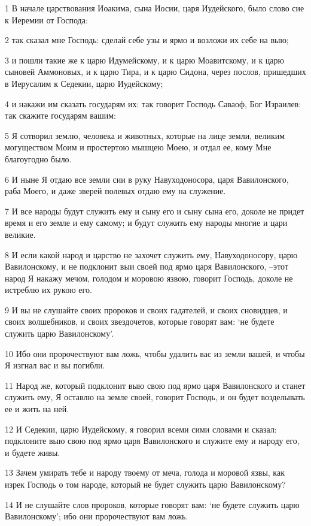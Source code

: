 \par 1 В начале царствования Иоакима, сына Иосии, царя Иудейского, было слово сие к Иеремии от Господа:
\par 2 так сказал мне Господь: сделай себе узы и ярмо и возложи их себе на выю;
\par 3 и пошли такие же к царю Идумейскому, и к царю Моавитскому, и к царю сыновей Аммоновых, и к царю Тира, и к царю Сидона, через послов, пришедших в Иерусалим к Седекии, царю Иудейскому;
\par 4 и накажи им сказать государям их: так говорит Господь Саваоф, Бог Израилев: так скажите государям вашим:
\par 5 Я сотворил землю, человека и животных, которые на лице земли, великим могуществом Моим и простертою мышцею Моею, и отдал ее, кому Мне благоугодно было.
\par 6 И ныне Я отдаю все земли сии в руку Навуходоносора, царя Вавилонского, раба Моего, и даже зверей полевых отдаю ему на служение.
\par 7 И все народы будут служить ему и сыну его и сыну сына его, доколе не придет время и его земле и ему самому; и будут служить ему народы многие и цари великие.
\par 8 И если какой народ и царство не захочет служить ему, Навуходоносору, царю Вавилонскому, и не подклонит выи своей под ярмо царя Вавилонского, --этот народ Я накажу мечом, голодом и моровою язвою, говорит Господь, доколе не истреблю их рукою его.
\par 9 И вы не слушайте своих пророков и своих гадателей, и своих сновидцев, и своих волшебников, и своих звездочетов, которые говорят вам: `не будете служить царю Вавилонскому'.
\par 10 Ибо они пророчествуют вам ложь, чтобы удалить вас из земли вашей, и чтобы Я изгнал вас и вы погибли.
\par 11 Народ же, который подклонит выю свою под ярмо царя Вавилонского и станет служить ему, Я оставлю на земле своей, говорит Господь, и он будет возделывать ее и жить на ней.
\par 12 И Седекии, царю Иудейскому, я говорил всеми сими словами и сказал: подклоните выю свою под ярмо царя Вавилонского и служите ему и народу его, и будете живы.
\par 13 Зачем умирать тебе и народу твоему от меча, голода и моровой язвы, как изрек Господь о том народе, который не будет служить царю Вавилонскому?
\par 14 И не слушайте слов пророков, которые говорят вам: `не будете служить царю Вавилонскому'; ибо они пророчествуют вам ложь.
